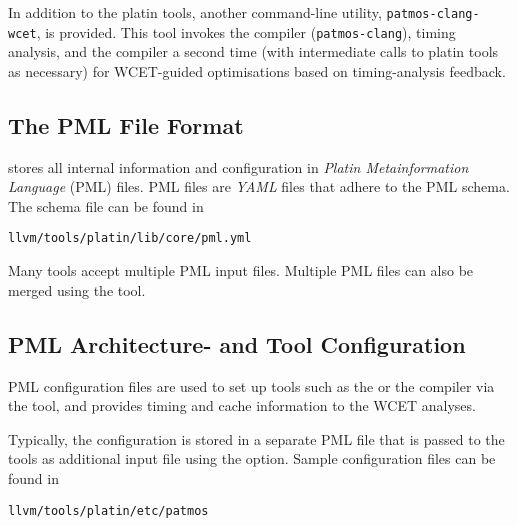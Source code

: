 In addition to the platin tools, another command-line utility,
\texttt{patmos-clang-wcet}, is provided. This tool invokes the compiler
(\texttt{patmos-clang}), timing analysis, and the compiler a second time
(with intermediate calls to platin tools as necessary) for WCET-guided
optimisations based on timing-analysis feedback.

\subsection{The PML File Format}

 stores all internal information and configuration in \emph{Platin Metainformation Language} (PML) files.
PML files are \emph{YAML} files that adhere to the PML schema. The schema file can be found in

\begin{verbatim}
llvm/tools/platin/lib/core/pml.yml
\end{verbatim}


Many  tools accept multiple PML input files. Multiple PML files can also be merged using
the  tool.

\subsection{PML Architecture- and Tool Configuration}

PML configuration files are used to set up tools such as the  or the
 compiler via the  tool, and provides timing and cache information to the WCET analyses.

Typically, the configuration is stored in a separate PML file that is passed to the  tools as
additional input file using the  option. Sample configuration files can be found in

\begin{verbatim}
llvm/tools/platin/etc/patmos
\end{verbatim}






